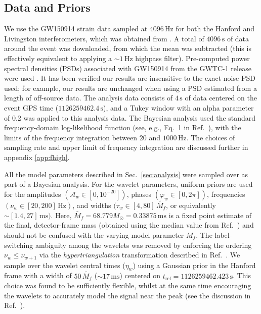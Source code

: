 \subsection{Data and Priors}
\label{sec:details}

We use the GW150914 strain data sampled at $4096\, \mathrm{Hz}$ for both the Hanford and Livingston interferometers, which was obtained from \cite{gwosc, RICHABBOTT2021100658}.
A total of $4096\,\mathrm{s}$ of data around the event was downloaded, from which the mean was subtracted (this is effectively equivalent to applying a $\sim 1\, \mathrm{Hz}$ highpass filter). 
Pre-computed power spectral densities (PSDs) associated with GW150914 from the GWTC-1 release were used \cite{gwtc1psds}. 
It has been verified our results are insensitive to the exact noise PSD used; for example, our results are unchanged when using a PSD estimated from a length of off-source data.
The analysis data consists of $4\,\mathrm{s}$ of data centered on the event GPS time ($1126259462.4\,\mathrm{s}$), and a Tukey window with an alpha parameter of 0.2 was applied to this analysis data.
The Bayesian analysis used the standard frequency-domain log-likelihood function (see, e.g., Eq.~1 in Ref.~\cite{Finch:2021qph}), with the limits of the frequency integration between $20$ and $1000\, \mathrm{Hz}$.
The choices of sampling rate and upper limit of frequency integration are discussed further in appendix \ref{app:fhigh}.

All the model parameters described in Sec.~\ref{sec:analysis} were sampled over as part of a Bayesian analysis.
For the wavelet parameters, uniform priors are used for the amplitudes $(\mathcal{A}_w \in [0,10^{-20}])$, phases $(\varphi_w \in [0,2\pi])$, frequencies $(\nu_w \in [20,200]\, \mathrm{Hz})$, and widths $(\tau_w \in [4,80]\, \tilde{M_f}$, or equivalently $\sim[1.4,27]\, \mathrm{ms})$.
Here, $\tilde{M_f}=68.779M_\odot=0.33875\,\mathrm{ms}$ is a fixed point estimate of the final, detector-frame mass (obtained using the median value from Ref.~\cite{LIGOScientific:2018mvr}) and should not be confused with the varying model parameter $M_f$.
The label-switching ambiguity among the wavelets was removed by enforcing the ordering 
$ \nu_w \leq \nu_{w+1} $ via the \emph{hypertriangulation} transformation described in Ref.~\cite{Buscicchio:2019rir}.
We sample over the wavelet central times ($\eta_w$) using a Gaussian prior in the Hanford frame with a width of $50\,\tilde{M_f}$ ($\sim 17\,\mathrm{ms}$) centered on $t_\mathrm{ref} = 1126259462.423\,\mathrm{s}$.
This choice was found to be sufficiently flexible, whilst at the same time encouraging the wavelets to accurately model the signal near the peak (see the discussion in Ref.~\cite{Finch:2021qph}).


